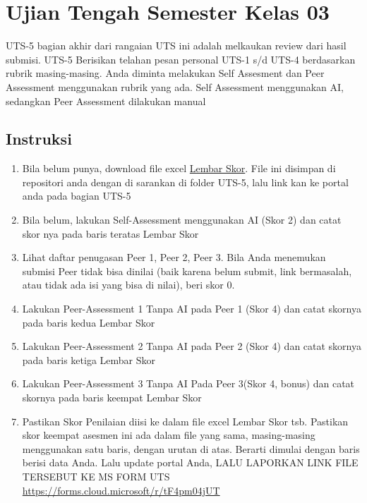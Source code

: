 \documentclass[
  letterpaper,
  DIV=11,
  numbers=noendperiod]{scrreprt}
\providecommand{\tightlist}{%
  \setlength{\itemsep}{0pt}\setlength{\parskip}{0pt}}
\begin{document}

\chapter{Ujian Tengah Semester Kelas
03}\label{ujian-tengah-semester-kelas-03}

UTS-5 bagian akhir dari rangaian UTS ini adalah melkaukan review dari
hasil submisi. UTS-5 Berisikan telahan pesan personal UTS-1 s/d UTS-4
berdasarkan rubrik masing-masing. Anda diminta melakukan Self Assesment
dan Peer Assessment menggunakan rubrik yang ada. Self Assessment
menggunakan AI, sedangkan Peer Assessment dilakukan manual

\section{Instruksi}\label{instruksi-1}

\begin{enumerate}
\def\labelenumi{\arabic{enumi}.}
\tightlist
\item
  Bila belum punya, download file excel
  \href{./asesmen/UTS-5_Skor.xlsx}{Lembar Skor}. File ini disimpan di
  repositori anda dengan di sarankan di folder UTS-5, lalu link kan ke
  portal anda pada bagian UTS-5
\item
  Bila belum, lakukan Self-Assessment menggunakan AI (Skor 2) dan catat
  skor nya pada baris teratas Lembar Skor
\item
  Lihat daftar penugasan Peer 1, Peer 2, Peer 3. Bila Anda menemukan
  submisi Peer tidak bisa dinilai (baik karena belum submit, link
  bermasalah, atau tidak ada isi yang bisa di nilai), beri skor 0.
\item
  Lakukan Peer-Assessment 1 Tanpa AI pada Peer 1 (Skor 4) dan catat
  skornya pada baris kedua Lembar Skor
\item
  Lakukan Peer-Assessment 2 Tanpa AI pada Peer 2 (Skor 4) dan catat
  skornya pada baris ketiga Lembar Skor
\item
  Lakukan Peer-Assessment 3 Tanpa AI Pada Peer 3(Skor 4, bonus) dan
  catat skornya pada baris keempat Lembar Skor
\item
  Pastikan Skor Penilaian diisi ke dalam file excel Lembar Skor tsb.
  Pastikan skor keempat asesmen ini ada dalam file yang sama,
  masing-masing menggunakan satu baris, dengan urutan di atas. Berarti
  dimulai dengan baris berisi data Anda. Lalu update portal Anda, LALU
  LAPORKAN LINK FILE TERSEBUT KE MS FORM UTS
  \url{https://forms.cloud.microsoft/r/tF4pm04jUT}
\end{enumerate}
\end{document}
